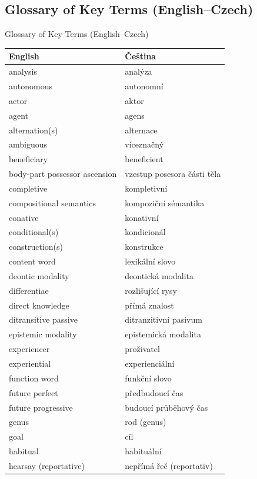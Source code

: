 \subsection*{Glossary of Key Terms (English--Czech)}

\begin{frame}[allowframebreaks]{Glossary of Key Terms (English--Czech)}

\begin{longtable}{ll}
  English & Čeština \\ \hline
  \endhead 
 analysis & analýza \\
 autonomous & autonomní \\
 actor & aktor \\
 agent & agens \\
 alternation(s) & alternace \\
 ambiguous & víceznačný \\
 beneficiary & beneficient \\
 body-part possessor ascension & vzestup posesora části těla \\
 completive & kompletivní \\
 compositional semantics & kompoziční sémantika \\
 conative & konativní \\
 conditional(s) & kondicionál \\
 construction(s) & konstrukce \\
 content word & lexikální slovo \\
 deontic modality & deontická modalita \\
 differentiae& rozlišující rysy \\
 direct knowledge & přímá znalost \\
 ditransitive passive & ditranzitivní pasivum \\
 epistemic modality & epistemická modalita \\
 experiencer & proživatel \\
 experiential & experienciální \\
 function word & funkční slovo \\
 future perfect & předbudoucí čas \\
 future progressive & budoucí průběhový čas \\
 genus & rod (genus) \\
 goal & cíl \\
 habitual & habituální \\
 hearsay (reportative) & nepřímá řeč (reportativ) \\

\end{longtable}
\end{frame}
